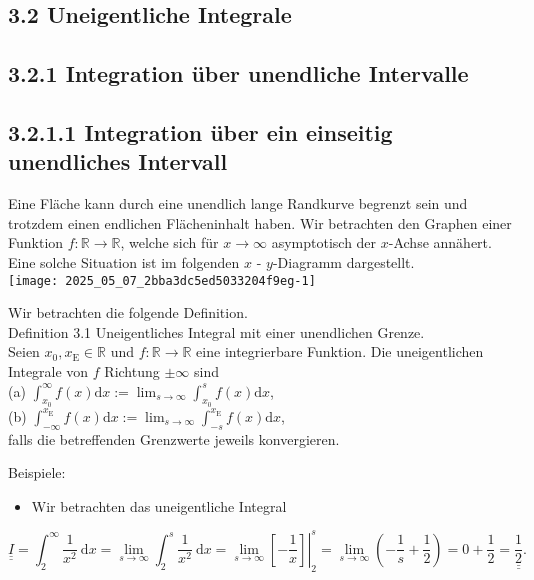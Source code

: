 \documentclass[10pt]{article}
\begin{document}
\subsection*{3.2 Uneigentliche Integrale}
\subsection*{3.2.1 Integration über unendliche Intervalle}
\subsection*{3.2.1.1 Integration über ein einseitig unendliches Intervall}
Eine Fläche kann durch eine unendlich lange Randkurve begrenzt sein und trotzdem einen endlichen Flächeninhalt haben. Wir betrachten den Graphen einer Funktion $f: \mathbb{R} \rightarrow \mathbb{R}$, welche sich für $x \rightarrow \infty$ asymptotisch der $x$-Achse annähert. Eine solche Situation ist im folgenden $x$ - $y$-Diagramm dargestellt.\\
\texttt{[image: 2025\_05\_07\_2bba3dc5ed5033204f9eg-1]}

Wir betrachten die folgende Definition.\\
Definition 3.1 Uneigentliches Integral mit einer unendlichen Grenze.\\
Seien $x_{0}, x_{\mathrm{E}} \in \mathbb{R}$ und $f: \mathbb{R} \rightarrow \mathbb{R}$ eine integrierbare Funktion. Die uneigentlichen Integrale von $f$ Richtung $\pm \infty$ sind\\
(a) $\int_{x_{0}}^{\infty} f(x) \mathrm{d} x:=\lim _{s \rightarrow \infty} \int_{x_{0}}^{s} f(x) \mathrm{d} x$,\\
(b) $\int_{-\infty}^{x_{\mathrm{E}}} f(x) \mathrm{d} x:=\lim _{s \rightarrow \infty} \int_{-s}^{x_{\mathrm{E}}} f(x) \mathrm{d} x$,\\
falls die betreffenden Grenzwerte jeweils konvergieren.

Beispiele:

\begin{itemize}
  \item Wir betrachten das uneigentliche Integral
\end{itemize}


\begin{equation*}
\underline{\underline{I}}=\int_{2}^{\infty} \frac{1}{x^{2}} \mathrm{~d} x=\lim _{s \rightarrow \infty} \int_{2}^{s} \frac{1}{x^{2}} \mathrm{~d} x=\left.\lim _{s \rightarrow \infty}\left[-\frac{1}{x}\right]\right|_{2} ^{s}=\lim _{s \rightarrow \infty}\left(-\frac{1}{s}+\frac{1}{2}\right)=0+\frac{1}{2}=\underline{\underline{\frac{1}{2}}} . \tag{3.30}
\end{equation*}
\end{document}

